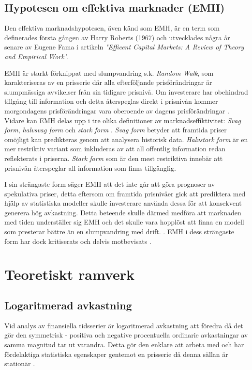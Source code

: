 \documentclass[12pt]{article}
\begin{document}
\subsection{Hypotesen om effektiva marknader (EMH)}
Den effektiva marknadshypotesen, även känd som EMH, är en term som definerades första gången av Harry Roberts (1967) och utvecklades några år senare av Eugene Fama \parencite*{Fama1970} i artikeln \emph{"Efficent Capital Markets: A Review of Theory and Empirical Work"}. 

EMH är starkt förknippat med slumpvandring s.k. \emph{Random Walk}, som karakteriseras av en prisserie där alla efterföljande prisförändringar är slumpmässiga avvikelser från sin tidigare prisnivå. Om investerare har obehindrad tillgång till information och detta återspeglas direkt i prisnivån kommer morgondagens prisförändringar vara oberoende av dagens prisförändringar \parencite{EMH}. Vidare kan EMH delas upp i tre olika definitioner av marknadseffiktivitet: \emph{Svag form}, \emph{halvsvag form} och \emph{stark form} \parencite{Fama1970}. \emph{Svag form} betyder att framtida priser omöjligt kan predikteras genom att analysera historisk data. \emph{Halvstark form} är en mer restriktiv variant som inkluderas av att all offentlig information redan reflekterats i priserna. \emph{Stark form} som är den mest restriktiva innebär att prisnivån återspeglar all information som finns tillgänglig.

I sin strängaste form säger EMH att det inte går att göra prognoser av spekulativa priser, detta eftersom om framtida prisnivåer gick att prediktera med hjälp av statistiska modeller skulle investerare använda dessa för att konsekvent generera hög avkastning. Detta beteende skulle därmed medföra att marknaden med tiden underställer sig EMH och det skulle vara hopplöst att finna en modell som presterar bättre än en slumpvandring med drift. \parencite{EMHforecast}. EMH i dess strängaste form har dock kritiserats och delvis motbevisats \parencite{basu1977investment, ball1978anomalies}.

\section{Teoretiskt ramverk}
\subsection{Logaritmerad avkastning}
Vid analys av finansiella tidsserier är logaritmerad avkastning att föredra då det gör den symmetrisk - positiva och negative procentuella ordinarie avkastningar av samma magnitud tar ut varandra. Detta gör den enklare att arbeta med och har fördelaktiga statistiska egenskaper gentemot en prisserie då denna sällan är stationär \parencite{Tsay2010}.
\end{document}
